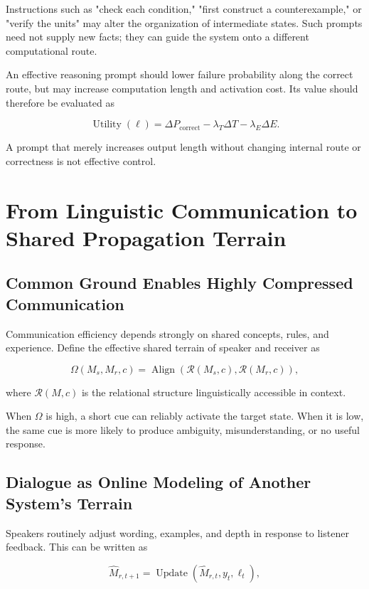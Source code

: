 \documentclass[11pt, a4paper]{article}
\begin{document}
Instructions such as "check each condition," "first construct a counterexample," or "verify the units" may alter the organization of intermediate states. Such prompts need not supply new facts; they can guide the system onto a different computational route.


An effective reasoning prompt should lower failure probability along the correct route, but may increase computation length and activation cost. Its value should therefore be evaluated as


\[
\operatorname{Utility}(\ell)
=
\Delta P_{\text{correct}}
-\lambda_T\Delta T
-\lambda_E\Delta E.
\tag{15}
\]

A prompt that merely increases output length without changing internal route or correctness is not effective control.



\section{From Linguistic Communication to Shared Propagation Terrain}


\subsection{Common Ground Enables Highly Compressed Communication}


Communication efficiency depends strongly on shared concepts, rules, and experience. Define the effective shared terrain of speaker and receiver as


\[
\Omega(M_s,M_r,c)
=
\operatorname{Align}
\left(
\mathcal{R}(M_s,c),
\mathcal{R}(M_r,c)
\right),
\tag{16}
\]

where $\mathcal{R}(M,c)$ is the relational structure linguistically accessible in context.


When $\Omega$ is high, a short cue can reliably activate the target state. When it is low, the same cue is more likely to produce ambiguity, misunderstanding, or no useful response.


\subsection{Dialogue as Online Modeling of Another System's Terrain}


Speakers routinely adjust wording, examples, and depth in response to listener feedback. This can be written as


\[
\hat M_{r,t+1}
=
\operatorname{Update}
\left(
\hat M_{r,t},
y_t,
\ell_t
\right),
\tag{17}
\]
\end{document}
